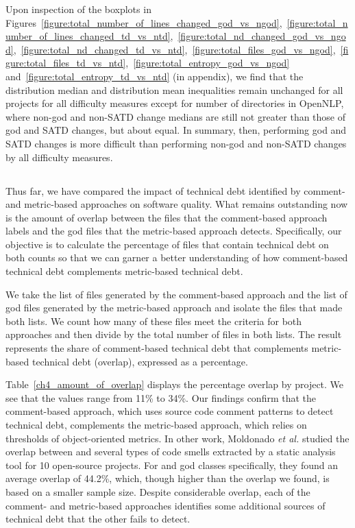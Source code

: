 {Upon inspection of the boxplots in Figures~\ref{figure:total_number_of_lines_changed_god_vs_ngod},~\ref{figure:total_number_of_lines_changed_td_vs_ntd},~\ref{figure:total_nd_changed_god_vs_ngod},~\ref{figure:total_nd_changed_td_vs_ntd},~\ref{figure:total_files_god_vs_ngod},~\ref{figure:total_files_td_vs_ntd},~\ref{figure:total_entropy_god_vs_ngod} and~\ref{figure:total_entropy_td_vs_ntd} \revision (in appendix), we find that the distribution median and distribution mean inequalities remain unchanged for all projects for all difficulty measures except for number of directories in OpenNLP, where non-god and non-SATD change medians are still not greater than those of god and SATD changes, but about equal. In summary, then, performing god and SATD changes is more difficult than performing non-god and non-SATD changes by all difficulty measures.


\subsection*{\chapterIVrqIV}



Thus far, we have compared the impact of technical debt identified by comment- and metric-based approaches on software quality. What remains outstanding now is the amount of overlap between the \SATD files that the comment-based approach labels and the god files that the metric-based approach detects. Specifically, our objective is to calculate the percentage of files that contain technical debt on both counts so that we can garner a better understanding of how comment-based technical debt complements metric-based technical debt.


We take the list of \SATD files generated by the comment-based approach and the list of god files generated by the metric-based approach and isolate the files that made both lists. We count how many of these files meet the criteria for both approaches and then divide by the total number of files in both lists. The result represents the share of comment-based technical debt that complements metric-based technical debt (overlap), expressed as a percentage.



Table~\ref{ch4_amount_of_overlap} displays the percentage overlap by project. We see that the values range from 11\% to 34\%. Our findings confirm that the comment-based approach, which uses source code comment patterns to detect technical debt, complements the metric-based approach, which relies on thresholds of object-oriented metrics. \revision In other work, Moldonado \textit{et al.} \cite{Maldonado_TSE2017} studied the overlap between \SATD and several types of code smells extracted by a static analysis tool for 10 open-source projects. For \SATD and god classes specifically, they found an average overlap of 44.2\%, which, though higher than the overlap we found, is based on a smaller sample size. Despite considerable overlap, each of the comment- and metric-based approaches identifies some additional sources of technical debt that the other fails to detect.

}
